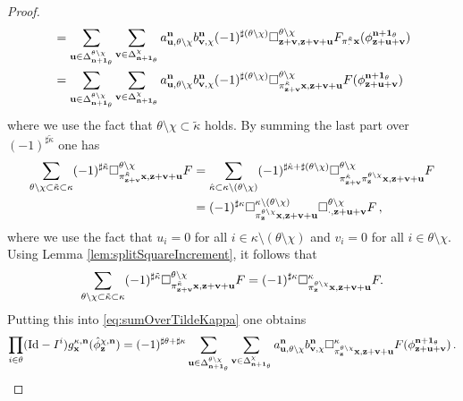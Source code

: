 \documentclass[12pt]{article}
\numberwithin{equation}{section}
\theoremstyle{plain}
\theoremstyle{definition}
\newcommand{\Id}{\mbox{Id}}
\def\fu{\mathbf u}\def\fv{\mathbf v}
\def\fone{{\boldsymbol 1}}
\begin{document}
\begin{proof}
\begin{align*}
        &= \sum_{\fu\in\Delta_{\fn+\fone_\theta}^{\theta\setminus\chi}}\sum_{\fv\in\Delta_{\fn+\fone_\theta}^\chi} a_{\fu, \theta\setminus\chi}^{\fn} b_{\fv,\chi}^{\fn}(-1)^{\sharp(\theta\setminus\chi)}\square_{\fz+\fv,\fz+\fv+\fu}^{\theta\setminus\chi} F_{\pi^{\tilde\kappa}_{\cdot} \fx}(\phi_{\fz+\fu+\fv}^{\fn+\fone_\theta})\\
        &= \sum_{\fu\in\Delta_{\fn+\fone_\theta}^{\theta\setminus\chi}}\sum_{\fv\in\Delta_{\fn+\fone_\theta}^\chi} a_{\fu, \theta\setminus\chi}^{\fn} b_{\fv,\chi}^{\fn} (-1)^{\sharp(\theta\setminus\chi)}\square_{\pi^{\tilde\kappa}_{\fz+\fv}\fx,\fz+\fv+\fu}^{\theta\setminus\chi} F(\phi_{\fz+\fu+\fv}^{\fn+\fone_\theta})\\
    \end{align*}
    where we use the fact that $\theta\setminus\chi\subset\tilde\kappa$ holds. By summing  the last part over $(-1)^{\sharp\tilde\kappa}$ one has 
    \begin{align*}
\sum_{\theta\setminus\chi\subset\tilde\kappa\subset\kappa}(-1)^{\sharp\tilde\kappa} \square_{\pi^{\tilde\kappa}_{\fz+\fv}\fx,\fz+\fv+\fu}^{\theta\setminus\chi} F &= \sum_{\hat\kappa\subset\kappa\setminus(\theta\setminus\chi)}(-1)^{\sharp\hat\kappa+\sharp(\theta\setminus\chi)} \square^{\theta\setminus\chi}_{\pi^{\hat\kappa}_{\fz+\fv} \pi_{\fz}^{\theta\setminus\chi} \fx,\fz+\fv+\fu}F\\
&= (-1)^{\sharp \kappa} \square^{\kappa\setminus(\theta\setminus\chi)}_{\pi^{\theta\setminus\chi}_{\fz}\fx,\fz+\fv+\fu}\square^{\theta\setminus\chi}_{\cdot,\fz+\fu+\fv} F\,,
\end{align*}
where we use the fact that $u_i = 0$ for all $i\in \kappa\setminus(\theta\setminus\chi)$ and $v_i = 0$ for all $i\in\theta\setminus\chi$. Using Lemma \ref{lem:splitSquareIncrement}, it follows that
 \begin{equation*}
\sum_{\theta\setminus\chi\subset\tilde\kappa\subset\kappa}(-1)^{\sharp\tilde\kappa} \square_{\pi^{\tilde\kappa}_{\fz+\fv}\fx,\fz+\fv+\fu}^{\theta\setminus\chi} F = (-1)^{\sharp\kappa} \square^\kappa_{\pi^{\theta\setminus\chi}_{\fz}\fx,\fz+\fv+\fu} F.
    \end{equation*}
Putting this into \eqref{eq:sumOverTildeKappa} one obtains
\begin{equation*}
 \prod_{i\in\theta}(\Id-I^i)g_\fx^{\kappa,\fn}(\hat\phi^{\chi,\fn}_\fz) = (-1)^{\sharp\theta+\sharp\kappa} \sum_{\fu\in\Delta_{\fn+\fone_\theta}^{\theta\setminus\chi}}\sum_{\fv\in\Delta_{\fn+\fone_\theta}^\chi} a_{\fu, \theta\setminus\chi}^{\fn} b_{\fv,\chi}^{\fn}\square^\kappa_{\pi^{\theta\setminus\chi}_{\fz}\fx,\fz+\fv+\fu} F(\phi^{\fn+\fone_\theta}_{\fz+\fu+\fv})\,.

\end{equation*}
\end{proof}
\end{document}
